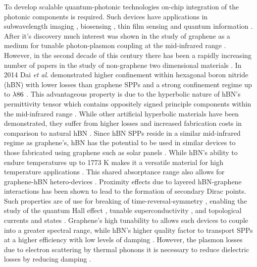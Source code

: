 \documentclass[12pt]{report}
\begin{document}
    To develop scalable quantum-photonic technologies on-chip integration of the photonic components is required. Such devices have applications in subwavelength imaging \cite{Silva:12,Fang:05}, biosensing \cite{Kneipp:97, Talley:05, Rodrigo:15}, thin film sensing \cite{Fali:19} and quantum information \cite{Chang:06, Gonzalez-Tudela:11, Bhimanapati:15}. After it’s discovery much interest was shown in the study of graphene as a medium for tunable photon-plasmon coupling at the mid-infrared range \cite{Koppens:11}. However, in the second decade of this century there has been a rapidly increasing number of papers in the study of non-graphene two dimensional materials \cite{Bhimanapati:15}. In 2014 Dai \textit{et al}. demonstrated higher confinement within hexagonal boron nitride (hBN) with lower losses than graphene SPPs \cite{Dai:14} and a strong confinement regime up to $\rm \lambda 86$ \cite{Caldwell:14}. This advantageous property is due to the hyperbolic nature of hBN’s permittivity tensor which contains oppositely signed principle components within the mid-infrared range \cite{Kumar:15}. While other artificial hyperbolic materials have been demonstrated, they suffer from higher losses and increased fabrication costs in comparison to natural hBN \cite{Biehs:12, Guo:12, Cortes:12}. Since hBN SPPs reside in a similar mid-infrared regime as graphene’s, hBN has the potential to be used in similar devices to those fabricated using graphene such as solar panels \cite{Bonaccorso:10}. While hBN’s ability to endure temperatures up to 1773 K makes it a versatile material for high temperature applications \cite{Jacob:12, Liu:07}. This shared absorptance range also allows for graphene-hBN hetero-devices \cite{Kretinin:14, Dean:10}. Proximity effects due to layered hBN-graphene interactions has been shown to lead to the formation of secondary Dirac points\cite{Dean:13, Hunt:13, Yu:14}. Such properties are of use for breaking of time-reversal-symmetry \cite{Haldane:08, Raghu:08, Chen:19}, enabling the study of the quantum Hall effect \cite{Dean:13, Hunt:13, Yu:14}, tunable superconductivity \cite{Chen:19}, and topological currents and states \cite{Chen:20, Novoselov:16}. Graphene’s high tunability to allows such devices to couple into a greater spectral range, while hBN’s higher quality factor to transport SPPs at a higher efficiency with low levels of damping \cite{Kumar:15, Dean:10, Geim:13, Woessner:15}. However, the plasmon losses due to electron scattering by thermal phonons it is necessary to reduce dielectric losses by reducing damping \cite{Woessner:15}.
\end{document}
